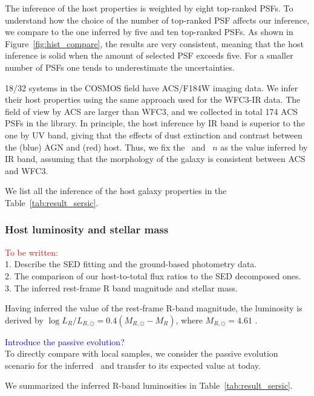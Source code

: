 \documentclass[apj]{emulateapj}
\begin{document}
The inference of the host properties is weighted by eight top-ranked PSFs. To understand how the choice of the number of top-ranked PSF affects our inference, we compare to the one inferred by five and ten top-ranked PSFs. As shown in Figure~\ref{fig:hist_compare}, the results are very consistent, meaning that the host inference is solid when the amount of selected PSF exceeds five. For a smaller number of PSFs one tends to underestimate the uncertainties.

18/32 systems in the COSMOS field have ACS/F184W imaging data. We infer their host properties using the same approach used for the WFC3-IR data. The field of view by ACS are larger than WFC3, and we collected in total 174 ACS PSFs in the library. In principle, the host inference by IR band is superior to the one by UV band, giving that the effects of dust extinction and contrast between the (blue) AGN and (red) host. Thus, we fix the \Reff\ and \sersic\ $n$ as the value inferred by IR band, assuming that the morphology of the galaxy is consistent between ACS and WFC3.

We list all the inference of the host galaxy properties in the Table~\ref{tab:result_sersic}.

\subsubsection{Host luminosity and stellar mass}
\textcolor{red}{To be written:}
\\1. Describe the SED fitting and the ground-based photometry data.
\\2. The comparison of our host-to-total flux ratios to the SED decomposed ones.
\\3. The inferred rest-frame R band magnitude and stellar mass.

Having inferred the value of the rest-frame R-band magnitude, the luminosity is derived by $\log L_R/L_{R, \odot} = 0.4 (M_{R, \odot}-M_R)$, where $M_{R, \odot}=4.61$ \citep{Blanton07}.

\textcolor{blue}{Introduce the passive evolution?}
\\To directly compare with local samples, we consider the passive evolution scenario for the inferred \lhost\ and transfer to its expected value at today.

We summarized the inferred R-band luminosities in Table~\ref{tab:result_sersic}.
\end{document}
